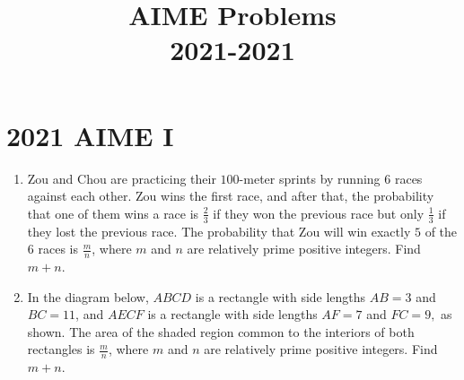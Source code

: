 \documentclass{article}
\title{AIME Problems \\ 2021-2021}
\date{}
\begin{document}
\maketitle\thispagestyle{fancy}\tableofcontents\newpage\section*{2021 AIME I}\begin{enumerate}[label=\arabic*., itemsep=0.5em]\item Zou and Chou are practicing their $100$-meter sprints by running $6$ races against each other. Zou wins the first race, and after that, the probability that one of them wins a race is $\frac23$ if they won the previous race but only $\frac13$ if they lost the previous race. The probability that Zou will win exactly $5$ of the $6$ races is $\frac mn$, where $m$ and $n$ are relatively prime positive integers. Find $m+n$.\par \vspace{0.5em}\item In the diagram below, $ABCD$ is a rectangle with side lengths $AB=3$ and $BC=11$, and $AECF$ is a rectangle with side lengths $AF=7$ and $FC=9,$ as shown. The area of the shaded region common to the interiors of both rectangles is $\frac mn$, where $m$ and $n$ are relatively prime positive integers. Find $m+n$.



\end{enumerate}
\end{document}
